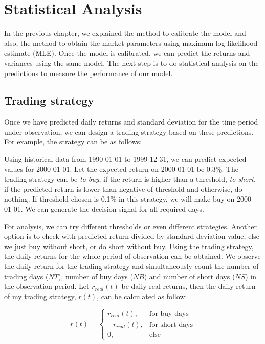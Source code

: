 \chapter{Statistical Analysis}
In the previous chapter, we explained the method to calibrate the model and also, the method to obtain the market parameters using maximum log-likelihood estimate (MLE). Once the model is calibrated, we can predict the returns and variances using the same model. The next step is to do statistical analysis on the predictions to measure the performance of our model.

\section{Trading strategy}
Once we have predicted daily returns and standard deviation for the time period under observation, we can design a trading strategy based on these predictions. For example, the strategy can be as follows: 

\par Using historical data from 1990-01-01 to 1999-12-31, we can predict expected values for 2000-01-01. Let the expected return on 2000-01-01 be 0.3\%. The trading strategy can be \textit{to buy}, if the return is higher than a threshold, \textit{to short}, if the predicted return is lower than negative of threshold and otherwise, do nothing. If threshold chosen is 0.1\% in this strategy, we will make buy on 2000-01-01. We can generate the decision signal for all required days.\newline

For analysis, we can try different thresholds or even different strategies. Another option is to check with predicted return divided by standard deviation value, else we just buy without short, or do short without buy.
Using the trading strategy, the daily returns for the whole period of observation can be obtained. We observe the daily return for the trading strategy and simultaneously count the number of trading days ($NT$), number of buy days ($NB$) and number of short days ($NS$) in the observation period. Let $r_{real}(t)$ be daily real returns, then the daily return of my trading strategy, $r(t)$, can be calculated as follow:

\begin{equation} \label{eqn:ret}
r(t) = 
\begin{cases}
  r_{real}(t), & \text{for buy days} \\
  -r_{real}(t),& \text{for short days} \\
  0,  & \text{else}
\end{cases}
\end{equation}

